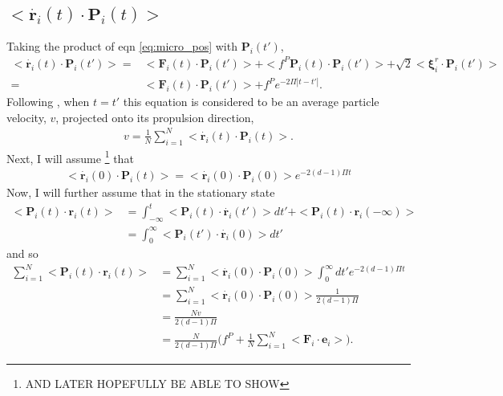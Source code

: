 \documentclass[twocolumn,amsmath,amssymb,aps]{revtex4-1}%
\begin{document}
\begin{widetext}
\subsection{$<\dot{\bm{r}_i}(t)\cdot\bm{P}_i(t)>$}
Taking the product of eqn \ref{eq:micro_pos} with $\bm{P}_i(t')$,
\begin{align}
  <\dot{\bm{r}_i}(t)\cdot\bm{P}_i(t')>
  =&<\bm{F}_i(t)\cdot\bm{P}_i(t')>+<f^P\bm{P}_i(t)\cdot\bm{P}_i(t')>
  +\sqrt{2}<\bm{\xi}_i^r\cdot\bm{P}_i(t')>\nonumber\\
  =&<\bm{F}_i(t)\cdot\bm{P}_i(t')>+f^Pe^{-2\Pi|t-t'|}.
\end{align}
Following \cite{C5SM01412C}, when $t=t'$ this equation is considered to be an
average particle velocity, $v$, projected onto its propulsion direction,
\begin{align}
  v=\frac{1}{N}\sum_{i=1}^N<\dot{\bm{r}_i}(t)\cdot\bm{P}_i(t)>.
\end{align}
Next, I will assume \footnote{AND LATER HOPEFULLY BE ABLE TO SHOW} that
\begin{align}
  <\dot{\bm{r}_i}(0)\cdot\bm{P}_i(t)>
  = <\dot{\bm{r}_i}(0)\cdot\bm{P}_i(0)>e^{-2(d-1)\Pi t}
\end{align}
Now, I will further assume that in the stationary state
\begin{align}
  <\bm{P}_i(t)\cdot\bm{r}_i(t)>
  &=\int_{-\infty}^t<\bm{P}_i(t)\cdot\dot{\bm{r}_i}(t')>dt'
  +<\bm{P}_i(t)\cdot\bm{r}_i(-\infty)>\nonumber\\
  &=\int_0^{\infty}<\bm{P}_i(t')\cdot\dot{\bm{r}_i}(0)>dt'
\end{align}
and so
\begin{align}
  \sum_{i=1}^N<\bm{P}_i(t)\cdot\bm{r}_i(t)>
  &=\sum_{i=1}^N<\dot{\bm{r}_i}(0)\cdot\bm{P}_i(0)>
  \int_0^{\infty}dt'e^{-2(d-1)\Pi t}\nonumber\\
  &=\sum_{i=1}^N<\dot{\bm{r}_i}(0)\cdot\bm{P}_i(0)>
  \frac{1}{2(d-1)\Pi}\nonumber\\
  &=\frac{Nv}{2(d-1)\Pi}\nonumber\\
  &=\frac{N}{2(d-1)\Pi}
  \bigg(f^P+\frac{1}{N}\sum_{i=1}^N<\bm{F}_i\cdot\bm{e}_i>\bigg).
\end{align}

\end{widetext}
\end{document}

